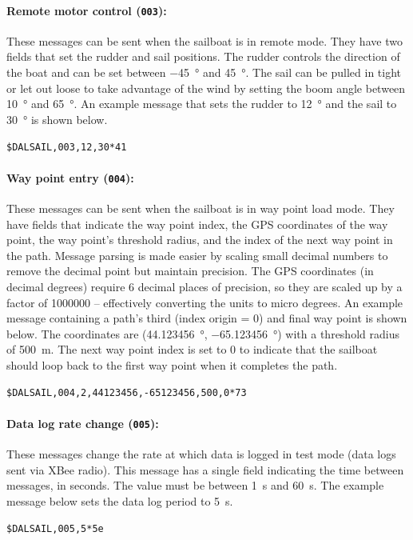 \documentclass[12pt]{article}
\begin{document}
\paragraph{Remote motor control (\texttt{003}):}
These messages can be sent when the sailboat is in remote mode. They have two fields that set the rudder and sail positions. The rudder controls the direction of the boat and can be set between \SI{-45}{\degree} and \SI{45}{\degree}. The sail can be pulled in tight or let out loose to take advantage of the wind by setting the boom angle between \SI{10}{\degree} and \SI{65}{\degree}. An example message that sets the rudder to \SI{12}{\degree} and the sail to \SI{30}{\degree} is shown below.
\begin{center}
	\texttt{\$DALSAIL,003,12,30*41}
\end{center}

\paragraph{Way point entry (\texttt{004}):}
These messages can be sent when the sailboat is in way point load mode. They have fields that indicate the way point index, the GPS coordinates of the way point, the way point's threshold radius, and the index of the next way point in the path. Message parsing is made easier by scaling small decimal numbers to remove the decimal point but maintain precision. The GPS coordinates (in decimal degrees) require 6 decimal places of precision, so they are scaled up by a factor of \SI{1000000}{} -- effectively converting the units to micro degrees. An example message containing a path's third (index origin = 0) and final way point is shown below. The coordinates are (\SI{44.123456}{\degree}, \SI{-65.123456}{\degree}) with a threshold radius of \SI{500}{\meter}. The next way point index is set to 0 to indicate that the sailboat should loop back to the first way point when it completes the path.
\begin{center}
	\texttt{\$DALSAIL,004,2,44123456,-65123456,500,0*73}
\end{center}

\paragraph{Data log rate change (\texttt{005}):}
These messages change the rate at which data is logged in test mode (data logs sent via XBee radio). This message has a single field indicating the time between messages, in seconds. The value must be between \SI{1}{\second} and \SI{60}{\second}. The example message below sets the data log period to \SI{5}{\second}.
\begin{center}
	\texttt{\$DALSAIL,005,5*5e}
\end{center}
\end{document}
